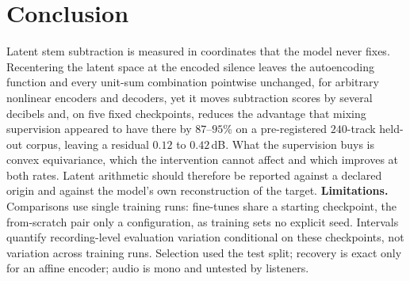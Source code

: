 \documentclass[conference]{IEEEtran}
\begin{document}
\section{Conclusion}\label{sec:conclusion}
Latent stem subtraction is measured in coordinates that the model never fixes.
Recentering the latent space at the encoded silence leaves the autoencoding
function and every unit-sum combination pointwise unchanged, for arbitrary
nonlinear encoders and decoders, yet it moves subtraction scores by several decibels and, on five fixed
checkpoints, reduces the advantage that mixing supervision appeared to have there by
$87$--$95$\% on a pre-registered $240$-track held-out corpus, leaving a
residual $0.12$ to $0.42$\,dB. What the supervision buys is convex equivariance, which the intervention
cannot affect and which improves at both rates. Latent arithmetic should therefore be reported against a declared origin and
against the model's own reconstruction of the target.
\textbf{Limitations.} Comparisons use single training runs: fine-tunes share
a starting checkpoint, the from-scratch pair only a configuration, as
training sets no explicit seed. Intervals quantify recording-level
evaluation variation conditional on these checkpoints, not variation across
training runs. Selection used the test split; recovery is exact only for an affine encoder;
audio is mono and untested by listeners.



\end{document}

